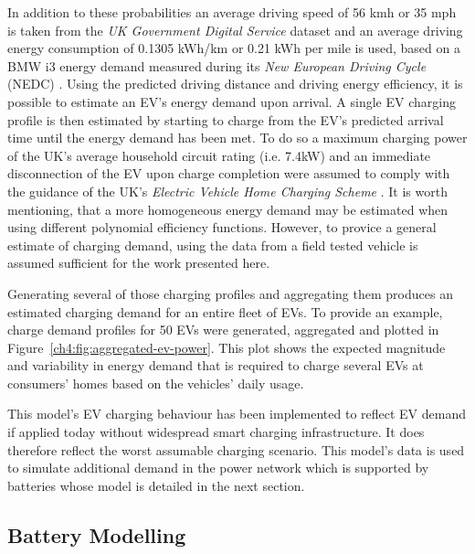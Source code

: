 


 
In addition to these probabilities an average driving speed of 56 kmh  or 35 mph is taken from the \textit{UK Government Digital Service} dataset \cite{UKGovernmentDigitalService2013} and an average driving energy consumption of 0.1305 kWh/km or 0.21 kWh per mile is used, based on a BMW i3 energy demand measured during its \textit{New European Driving Cycle} (NEDC) \cite{BMW_press_i3}.
Using the predicted driving distance and driving energy efficiency, it is possible to estimate an EV's energy demand upon arrival.
A single EV charging profile is then estimated by starting to charge from the EV's predicted arrival time until the energy demand has been met.
To do so a maximum charging power of the UK's average household circuit rating (i.e. 7.4kW) and an immediate disconnection of the EV upon charge completion were assumed to comply with the guidance of the UK's \textit{Electric Vehicle Home Charging Scheme} \cite{EVHomeCharging}.
It is worth mentioning, that a more homogeneous energy demand may be estimated when using different polynomial efficiency functions.
However, to provice a general estimate of charging demand, using the data from a field tested vehicle is assumed sufficient for the work presented here.



Generating several of those charging profiles and aggregating them produces an estimated charging demand for an entire fleet of EVs.
To provide an example, charge demand profiles for 50 EVs were generated, aggregated and plotted in Figure~\ref{ch4:fig:aggregated-ev-power}.
This plot shows the expected magnitude and variability in energy demand that is required to charge several EVs at consumers' homes based on the vehicles' daily usage.

This model's EV charging behaviour has been implemented to reflect EV demand if applied today without widespread smart charging infrastructure.
It does therefore reflect the worst assumable charging scenario.
This model's data is used to simulate additional demand in the power network which is supported by batteries whose model is detailed in the next section.

\subsection{Battery Modelling}

